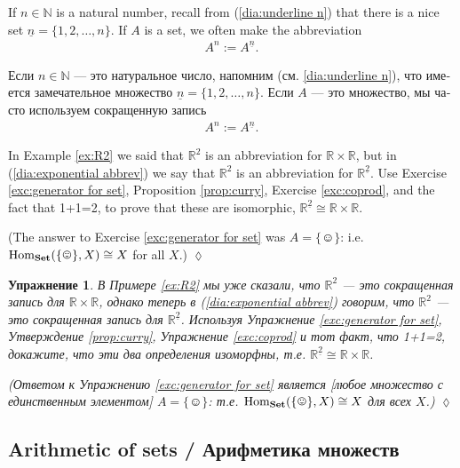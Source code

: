 \documentclass[a4paper]{book}
\def\tn{\textnormal}
\def\RR{{\mathbb R}}
\def\NN{{\mathbb N}}
\def\Hom{\tn{Hom}}
\def\singleton{\{\smiley\}}
\def\iso{\cong}
\def\ul{\underline}
\def\Set{{\bf Set}}
\theoremstyle{myth}
\newtheorem{excENG}[envENG]{\begin{english}Exercise\end{english}}
\newenvironment{exerciseENG}{\begin{excENG}}{\hspace*{\fill}$\lozenge$\end{excENG}}
\newtheorem{excRUS}[envRUS]{Упражнение}
\newenvironment{exerciseRUS}{\begin{excRUS}}{\hspace*{\fill}$\lozenge$\end{excRUS}}
\begin{document}
\begin{russian}
If $n\in\NN$ is a natural number, recall from (\ref{dia:underline n}) that there is a nice set $\ul{n}=\{1,2,\ldots,n\}$. If $A$ is a set, we often make the abbreviation 
\begin{align}\label{dia:exponential abbrev}
A^n:=A^{\ul{n}}.
\end{align}

Если $n\in\NN$ — это натуральное число, напомним (см. \ref{dia:underline n}), что имеется замечательное множество $\ul{n}=\{1,2,\ldots,n\}$. Если $A$ — это множество, мы часто используем сокращенную запись
\begin{align}\label{dia:exponential abbrev}
A^n:=A^{\ul{n}}.
\end{align}

\begin{exerciseENG}\label{exc:two R2s}
In Example \ref{ex:R2} we said that $\RR^2$ is an abbreviation for $\RR\times\RR$, but in (\ref{dia:exponential abbrev}) we say that $\RR^2$ is an abbreviation for $\RR^{\ul{2}}$. Use Exercise \ref{exc:generator for set}, Proposition \ref{prop:curry}, Exercise \ref{exc:coprod}, and the fact that 1+1=2, to prove that these are isomorphic, $\RR^{\ul{2}}\iso\RR\times\RR$.

(The answer to Exercise \ref{exc:generator for set} was $A=\singleton$: i.e. $\Hom_\Set(\singleton,X)\iso X$ for all $X$.)
\end{exerciseENG}

\begin{exerciseRUS}\label{exc:two R2s}
В Примере \ref{ex:R2} мы уже сказали, что $\RR^2$ — это сокращенная запись для $\RR\times\RR$, однако теперь в (\ref{dia:exponential abbrev}) говорим, что $\RR^2$ — это сокращенная запись для $\RR^{\ul{2}}$. Используя Упражнение \ref{exc:generator for set}, Утверждение \ref{prop:curry}, Упражнение \ref{exc:coprod} и тот факт, что 1+1=2, докажите, что эти два определения изоморфны, т.е. $\RR^{\ul{2}}\iso\RR\times\RR$.

(Ответом к Упражнению \ref{exc:generator for set} является [любое множество с единственным элементом] $A=\singleton$: т.е. $\Hom_\Set(\singleton,X)\iso X$ для всех $X$.)
\end{exerciseRUS}


\subsection{Arithmetic of sets / Арифметика множеств}\label{sec:arithmetic of sets}


\end{russian}
\end{document}
